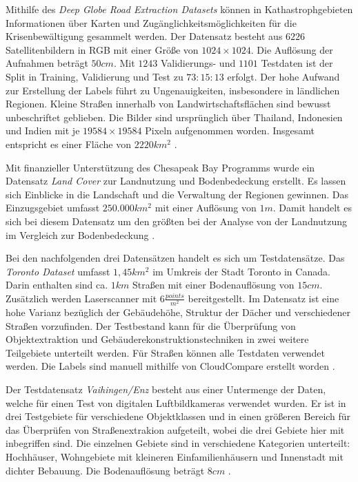 Mithilfe des \textit{Deep Globe Road Extraction Datasets} können in Kathastrophgebieten Informationen über Karten und Zugänglichkeitsmöglichkeiten für die Krisenbewältigung gesammelt werden.
Der Datensatz besteht aus $6226$ Satellitenbildern in RGB mit einer Größe von $1024\times 1024$.
Die Auflösung der Aufnahmen beträgt $50 cm$.
Mit $1243$ Validierungs- und $1101$ Testdaten ist der Split in Training, Validierung und Test zu $73:15:13$ erfolgt.
Der hohe Aufwand zur Erstellung der Labels führt zu Ungenauigkeiten, insbesondere in ländlichen Regionen. 
Kleine Straßen innerhalb von Landwirtschaftsflächen sind bewusst unbeschriftet geblieben.
Die Bilder sind ursprünglich über Thailand, Indonesien und Indien mit je $19584\times 19584$ Pixeln aufgenommen worden.
Insgesamt entspricht es einer Fläche von $2220 km^2$ \cite{Ashwath.10.11.2020}.

Mit finanzieller Unterstützung des Chesapeak Bay Programms wurde ein Datensatz \textit{Land Cover} zur Landnutzung und Bodenbedeckung erstellt.
Es lassen sich Einblicke in die Landschaft und die Verwaltung der Regionen gewinnen.
Das Einzugsgebiet umfasst $250.000km^2$ mit einer Auflösung von $1m$. 
Damit handelt es sich bei diesem Datensatz um den größten bei der Analyse von der Landnutzung im Vergleich zur Bodenbedeckung \cite{ChesapeakeConservancy.02.06.2022}.

Bei den nachfolgenden drei Datensätzen handelt es sich um Testdatensätze.
Das \textit{Toronto Dataset} umfasst $1,45km^2$ im Umkreis der Stadt Toronto in Canada. 
Darin enthalten sind ca. $1 km$ Straßen mit einer Bodenauflösung von $15cm$. 
Zusätzlich werden Laserscanner mit $6 \frac{points}{m^2}$ bereitgestellt.
Im Datensatz ist eine hohe Varianz bezüglich der Gebäudehöhe, Struktur der Dächer und verschiedener Straßen vorzufinden.
Der Testbestand kann für die Überprüfung von Objektextraktion und Gebäuderekonstruktionstechniken in zwei weitere Teilgebiete unterteilt werden.
Für Straßen können alle Testdaten verwendet werden.
Die Labels sind manuell mithilfe von CloudCompare erstellt worden \cite{Englich.06.10.2022b,Tan.2020}.

Der Testdatensatz \textit{Vaihingen/Enz} besteht aus einer Untermenge der Daten, welche für einen Test von digitalen Luftbildkameras verwendet wurden.
Er ist in drei Testgebiete für verschiedene Objektklassen und in einen größeren Bereich für das Überprüfen von Straßenextrakion aufgeteilt, wobei die drei Gebiete hier mit inbegriffen sind.
Die einzelnen Gebiete sind in verschiedene Kategorien unterteilt: Hochhäuser, Wohngebiete mit kleineren Einfamilienhäusern und Innenstadt mit dichter Bebauung.
Die Bodenauflösung beträgt $8cm$ \cite{Englich.06.10.2022b}.

